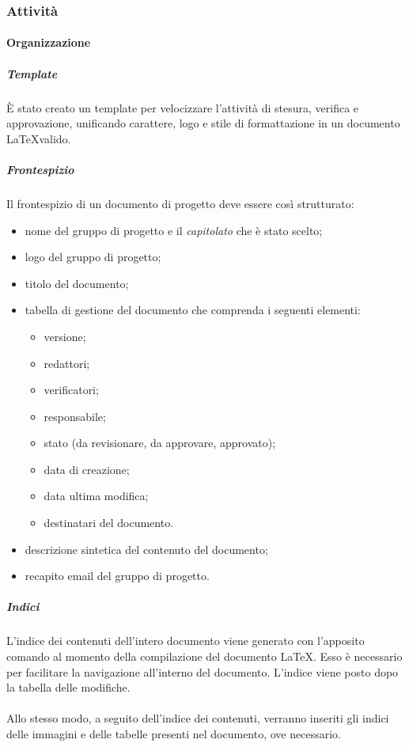   \subsubsection{Attività}
  \paragraph{Organizzazione}
  \subparagraph*{Template}
  \`E stato creato un template per velocizzare l'attività di stesura, verifica e
  approvazione, unificando carattere, logo e stile di formattazione
  in un documento \LaTeX \space valido.

  \subparagraph*{Frontespizio}
  Il frontespizio di un documento di progetto deve essere così strutturato:
  \begin{itemize}
    \item nome del gruppo di progetto e il \textit{capitolato\glo} che è stato scelto;
    \item logo del gruppo di progetto;
    \item titolo del documento;
    \item tabella di gestione del documento che comprenda i seguenti elementi:
    \begin{itemize}
      \item versione;
      \item redattori;
      \item verificatori;
      \item responsabile;
      \item stato (da revisionare, da approvare, approvato);
      \item data di creazione;
      \item data ultima modifica;
      \item destinatari del documento.
    \end{itemize}
    \item descrizione sintetica del contenuto del documento;
    \item recapito email del gruppo di progetto.
  \end{itemize}

  \subparagraph*{Indici}
  L'indice dei contenuti dell'intero documento viene generato con l'apposito comando al momento della compilazione
  del documento \LaTeX. Esso è necessario per facilitare la navigazione all'interno del
  documento. L'indice viene posto dopo la tabella delle modifiche.\\\\
  Allo stesso modo, a seguito dell'indice dei contenuti, verranno inseriti gli indici delle immagini e delle tabelle presenti nel documento, ove necessario.

